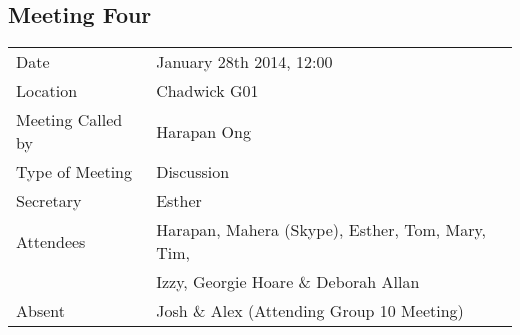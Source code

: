 \subsection{Meeting Four}

\begin{tabular}{l l}
  Date & January 28th 2014, 12:00 \\
  Location & Chadwick G01 \\
  Meeting Called by & Harapan Ong \\
  Type of Meeting & Discussion \\
  Secretary & Esther \\
  Attendees & Harapan, Mahera (Skype), Esther, Tom, Mary, Tim, \\ & Izzy,  Georgie Hoare \& Deborah Allan \\
  Absent & Josh \& Alex (Attending Group 10 Meeting) \\  
\end{tabular}

